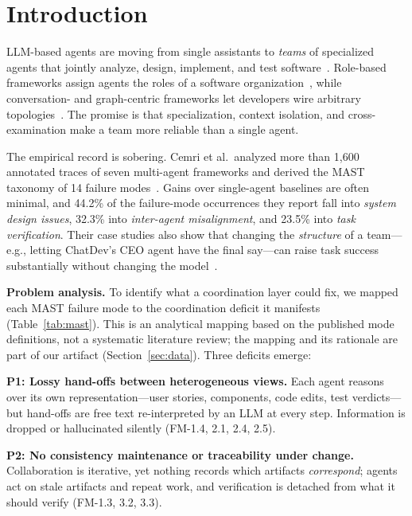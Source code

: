 \documentclass[10pt, anonymous, conference]{IEEEtran}
\theoremstyle{definition}
\theoremstyle{plain}
\theoremstyle{remark}
\begin{document}
\section{Introduction}\label{sec:introduction}

LLM-based agents are moving from single assistants to \emph{teams} of
specialized agents that jointly analyze, design, implement, and test
software~\cite{he2025lma}. Role-based frameworks assign agents the roles of a
software organization~\cite{hong2024metagpt,qian2024chatdev,tao2024magis},
while conversation- and graph-centric frameworks let developers wire arbitrary
topologies~\cite{wu2024autogen,li2023camel,chen2024agentverse}. The promise is
that specialization, context isolation, and cross-examination make a team more
reliable than a single agent.

The empirical record is sobering. Cemri et al.\ analyzed more than 1{,}600
annotated traces of seven multi-agent frameworks and derived the MAST taxonomy
of 14 failure modes~\cite{cemri2025mast}. Gains over single-agent baselines
are often minimal, and 44.2\% of the failure-mode occurrences they report fall
into \emph{system design issues}, 32.3\% into \emph{inter-agent misalignment},
and 23.5\% into \emph{task verification}. Their case studies also show that
changing the \emph{structure} of a team---e.g., letting ChatDev's CEO agent
have the final say---can raise task success substantially without changing the
model~\cite{cemri2025mast}.

\smallskip\noindent\textbf{Problem analysis.} To identify what a
coordination layer could fix, we mapped each MAST failure mode to the
coordination deficit it manifests (Table~\ref{tab:mast}). This is an
analytical mapping based on the published mode definitions, not a systematic
literature review; the mapping and its rationale are part of our
artifact (Section~\ref{sec:data}). Three deficits emerge:

\noindent\textbf{P1: Lossy hand-offs between heterogeneous views.} Each agent
reasons over its own representation---user stories, components, code edits,
test verdicts---but hand-offs are free text re-interpreted by an LLM at every
step. Information is dropped or hallucinated silently (FM-1.4, 2.1, 2.4, 2.5).

\noindent\textbf{P2: No consistency maintenance or traceability under
change.} Collaboration is iterative, yet nothing records which artifacts
\emph{correspond}; agents act on stale artifacts and repeat work, and
verification is detached from what it should verify (FM-1.3, 3.2, 3.3).
\end{document}
